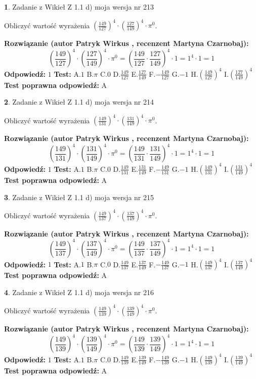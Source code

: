 \documentclass[12pt, a4paper]{article}
\theoremstyle{definition} %
\newtheorem{zad}{}
\newcommand{\zadStart}[1]{\begin{zad}#1\newline}
\newcommand{\zadStop}{\end{zad}}
\newcommand{\rozwStart}[2]{\noindent \textbf{Rozwiązanie (autor #1 , recenzent #2): }\newline}
\newcommand{\rozwStop}{\newline}
\newcommand{\odpStart}{\noindent \textbf{Odpowiedź:}\newline}
\newcommand{\odpStop}{\newline}
\newcommand{\testStart}{\noindent \textbf{Test:}\newline}
\newcommand{\testStop}{\newline}
\newcommand{\kluczStart}{\noindent \textbf{Test poprawna odpowiedź:}\newline}
\newcommand{\kluczStop}{\newline}
\begin{document}
\zadStart{Zadanie z Wikieł Z 1.1 d) moja wersja nr 213}

Obliczyć wartość wyrażenia $(\frac{149}{127})^{4} \cdot (\frac{127}{149})^{4} \cdot \pi^{0}$.
\zadStop
\rozwStart{Patryk Wirkus}{Martyna Czarnobaj}
$$(\frac{149}{127})^{4} \cdot (\frac{127}{149})^{4} \cdot \pi^{0} = (\frac{149}{127} \cdot \frac{127}{149})^{4} \cdot 1 = 1^{4} \cdot 1 = 1$$
\rozwStop
\odpStart
$1$
\odpStop
\testStart
A.$1$ B.$\pi$ C.$0$ D.$\frac{149}{127}$ E.$\frac{127}{149}$
F.$-\frac{149}{127}$ G.$-1$
H.$(\frac{149}{127})^{4}$
I.$(\frac{127}{149})^{4}$
\testStop
\kluczStart
A
\kluczStop



\zadStart{Zadanie z Wikieł Z 1.1 d) moja wersja nr 214}

Obliczyć wartość wyrażenia $(\frac{149}{131})^{4} \cdot (\frac{131}{149})^{4} \cdot \pi^{0}$.
\zadStop
\rozwStart{Patryk Wirkus}{Martyna Czarnobaj}
$$(\frac{149}{131})^{4} \cdot (\frac{131}{149})^{4} \cdot \pi^{0} = (\frac{149}{131} \cdot \frac{131}{149})^{4} \cdot 1 = 1^{4} \cdot 1 = 1$$
\rozwStop
\odpStart
$1$
\odpStop
\testStart
A.$1$ B.$\pi$ C.$0$ D.$\frac{149}{131}$ E.$\frac{131}{149}$
F.$-\frac{149}{131}$ G.$-1$
H.$(\frac{149}{131})^{4}$
I.$(\frac{131}{149})^{4}$
\testStop
\kluczStart
A
\kluczStop



\zadStart{Zadanie z Wikieł Z 1.1 d) moja wersja nr 215}

Obliczyć wartość wyrażenia $(\frac{149}{137})^{4} \cdot (\frac{137}{149})^{4} \cdot \pi^{0}$.
\zadStop
\rozwStart{Patryk Wirkus}{Martyna Czarnobaj}
$$(\frac{149}{137})^{4} \cdot (\frac{137}{149})^{4} \cdot \pi^{0} = (\frac{149}{137} \cdot \frac{137}{149})^{4} \cdot 1 = 1^{4} \cdot 1 = 1$$
\rozwStop
\odpStart
$1$
\odpStop
\testStart
A.$1$ B.$\pi$ C.$0$ D.$\frac{149}{137}$ E.$\frac{137}{149}$
F.$-\frac{149}{137}$ G.$-1$
H.$(\frac{149}{137})^{4}$
I.$(\frac{137}{149})^{4}$
\testStop
\kluczStart
A
\kluczStop



\zadStart{Zadanie z Wikieł Z 1.1 d) moja wersja nr 216}

Obliczyć wartość wyrażenia $(\frac{149}{139})^{4} \cdot (\frac{139}{149})^{4} \cdot \pi^{0}$.
\zadStop
\rozwStart{Patryk Wirkus}{Martyna Czarnobaj}
$$(\frac{149}{139})^{4} \cdot (\frac{139}{149})^{4} \cdot \pi^{0} = (\frac{149}{139} \cdot \frac{139}{149})^{4} \cdot 1 = 1^{4} \cdot 1 = 1$$
\rozwStop
\odpStart
$1$
\odpStop
\testStart
A.$1$ B.$\pi$ C.$0$ D.$\frac{149}{139}$ E.$\frac{139}{149}$
F.$-\frac{149}{139}$ G.$-1$
H.$(\frac{149}{139})^{4}$
I.$(\frac{139}{149})^{4}$
\testStop
\kluczStart
A
\kluczStop
\end{document}
